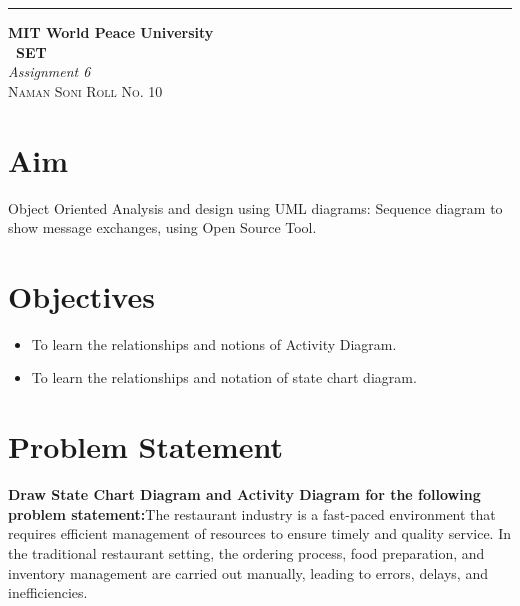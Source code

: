 \documentclass{article}
\begin{document}
\begin{titlepage} %

\raggedleft\rule{1pt}{\textheight} %
\hspace{0.05\textwidth} %
\parbox[b]{0.75\textwidth}
	{%

            {\Huge\bfseries MIT World Peace University \\[0.5\baselineskip] \ SET}\\[2\baselineskip] %
            {\large\textit{Assignment 6}}\\[4\baselineskip] %
            {\Large\textsc{Naman Soni Roll No. 10}} %

   \vspace{0.5\textheight} %
   }

\end{titlepage}
\tableofcontents
\pagebreak
\section{\textbf{Aim}}
Object Oriented Analysis and design using UML diagrams: Sequence diagram to show message exchanges, using Open Source Tool.
\section{\textbf{Objectives}}
\begin{itemize}
    \item To learn the relationships and notions of Activity Diagram.
    \item To learn the relationships and notation of state chart diagram.
\end{itemize}
\section{\textbf{Problem Statement}}
\textbf{Draw State Chart Diagram and Activity Diagram for the following problem statement:}The restaurant industry is a fast-paced environment that requires efficient management of resources to ensure timely and quality service. In the traditional restaurant setting, the ordering process, food preparation, and inventory management are carried out manually, leading to errors, delays, and inefficiencies.
\end{document}
